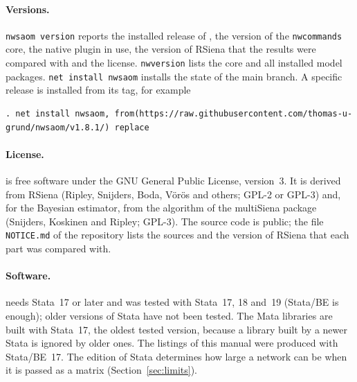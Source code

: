 \paragraph{Versions.} \texttt{nwsaom version} reports the installed release of \nwsaom{}, the version of the \texttt{nwcommands} core, the native plugin in use, the version of RSiena that the results were compared with and the license. \texttt{nwversion} lists the core and all installed model packages. \texttt{net install nwsaom} installs the state of the main branch. A specific release is installed from its tag, for example
\begin{lstlisting}
. net install nwsaom, from(https://raw.githubusercontent.com/thomas-u-grund/nwsaom/v1.8.1/) replace
\end{lstlisting}

\paragraph{License.} \nwsaom{} is free software under the GNU General Public License, version~3. It is derived from RSiena (Ripley, Snijders, Boda, V\"or\"os and others; GPL-2 or GPL-3) and, for the Bayesian estimator, from the algorithm of the multiSiena package (Snijders, Koskinen and Ripley; GPL-3). The source code is public; the file \texttt{NOTICE.md} of the repository lists the sources and the version of RSiena that each part was compared with.

\paragraph{Software.} \nwsaom{} needs Stata~17 or later and was tested with Stata~17, 18 and~19 (Stata/BE is enough); older versions of Stata have not been tested. The Mata libraries are built with Stata~17, the oldest tested version, because a library built by a newer Stata is ignored by older ones. The listings of this manual were produced with Stata/BE~17. The edition of Stata determines how large a network can be when it is passed as a matrix (Section~\ref{sec:limits}).

